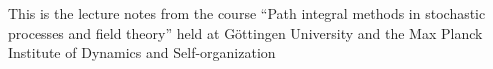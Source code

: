 This is the lecture notes from the course ``Path integral methods in stochastic processes and field theory'' held at Göttingen University and the Max Planck Institute of Dynamics and Self-organization